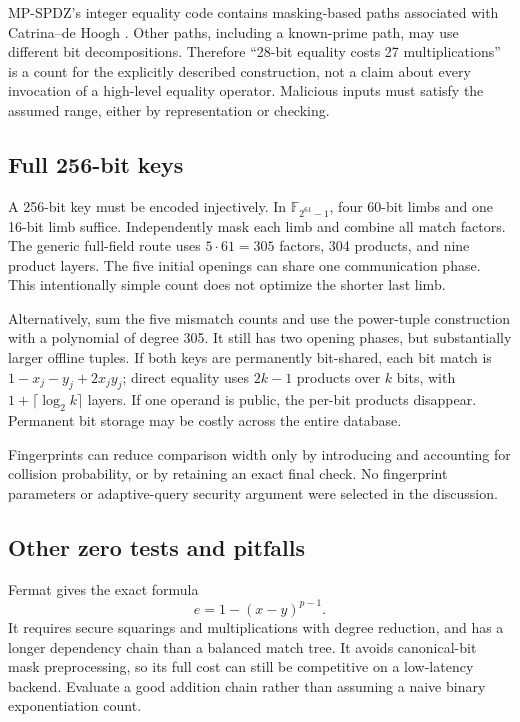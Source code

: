 \documentclass[11pt]{article}
\newcommand{\F}{\mathbb F}
\begin{document}
MP-SPDZ's integer equality code contains masking-based paths associated with
Catrina--de Hoogh \cite{catrina2010,mpspdzeq}. Other paths, including a known-prime
path, may use different bit decompositions. Therefore ``28-bit equality costs
27 multiplications'' is a count for the explicitly described construction, not
a claim about every invocation of a high-level equality operator. Malicious
inputs must satisfy the assumed range, either by representation or checking.

\subsection{Full 256-bit keys}

A 256-bit key must be encoded injectively. In $\F_{2^{61}-1}$, four 60-bit limbs
and one 16-bit limb suffice. Independently mask each limb and combine all match
factors. The generic full-field route uses $5\cdot61=305$ factors, 304 products,
and nine product layers. The five initial openings can share one communication
phase. This intentionally simple count does not optimize the shorter last limb.

Alternatively, sum the five mismatch counts and use the power-tuple
construction with a polynomial of degree 305. It still has two opening phases,
but substantially larger offline tuples. If both keys are permanently bit-shared,
each bit match is $1-x_j-y_j+2x_jy_j$; direct equality uses $2k-1$ products over
$k$ bits, with $1+\lceil\log_2k\rceil$ layers. If one operand is public, the
per-bit products disappear. Permanent bit storage may be costly across the
entire database.

Fingerprints can reduce comparison width only by introducing and accounting for
collision probability, or by retaining an exact final check. No fingerprint
parameters or adaptive-query security argument were selected in the discussion.

\subsection{Other zero tests and pitfalls}

Fermat gives the exact formula
\[
e=1-(x-y)^{p-1}.
\]
It requires secure squarings and multiplications with degree reduction, and has
a longer dependency chain than a balanced match tree. It avoids canonical-bit
mask preprocessing, so its full cost can still be competitive on a low-latency
backend. Evaluate a good addition chain rather than assuming a naive binary
exponentiation count.
\end{document}
